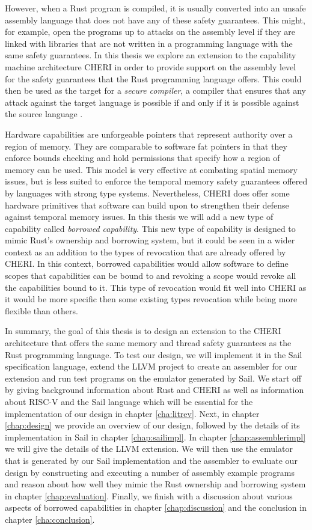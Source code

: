 However, when a Rust program is compiled, it is usually converted into an unsafe assembly language that does not have any of these safety guarantees.
This might, for example, open the programs up to attacks on the assembly level if they are linked with libraries that are not written in a programming language with the same safety guarantees.
In this thesis we explore an extension to the capability machine architecture CHERI in order to provide support on the assembly level for the safety guarantees that the Rust programming language offers.
This could then be used as the target for a \textit{secure compiler}, a compiler that ensures that any attack against the target language is possible if and only if it is possible against the source language \cite{8049734}.

Hardware capabilities are unforgeable pointers that represent authority over a region of memory.
They are comparable to software fat pointers in that they enforce bounds checking and hold permissions that specify how a region of memory can be used.
This model is very effective at combating spatial memory issues, but is less suited to enforce the temporal memory safety guarantees offered by languages with strong type systems.
Nevertheless, CHERI does offer some hardware primitives that software can build upon to strengthen their defense against temporal memory issues.
In this thesis we will add a new type of capability called \textit{borrowed capability}.
This new type of capability is designed to mimic Rust's ownership and borrowing system, but it could be seen in a wider context as an addition to the types of revocation that are already offered by CHERI.
In this context, borrowed capabilities would allow software to define scopes that capabilities can be bound to and revoking a scope would revoke all the capabilities bound to it.
This type of revocation would fit well into CHERI as it would be more specific then some existing types revocation while being more flexible than others.

In summary, the goal of this thesis is to design an extension to the CHERI architecture that offers the same memory and thread safety guarantees as the Rust programming language.
To test our design, we will implement it in the Sail specification language, extend the LLVM project to create an assembler for our extension and run test programs on the emulator generated by Sail.
We start off by giving background information about Rust and CHERI as well as information about RISC-V and the Sail language which will be essential for the implementation of our design in chapter \ref{cha:litrev}.
Next, in chapter \ref{chap:design} we provide an overview of our design, followed by the details of its implementation in Sail in chapter \ref{chap:sailimpl}.
In chapter \ref{chap:assemblerimpl} we will give the details of the LLVM extension.
We will then use the emulator that is generated by our Sail implementation and the assembler to evaluate our design by constructing and executing a number of assembly example programs and reason about how well they mimic the Rust ownership and borrowing system in chapter \ref{chap:evaluation}.
Finally, we finish with a discussion about various aspects of borrowed capabilities in chapter \ref{chap:discussion} and the conclusion in chapter \ref{cha:conclusion}.

